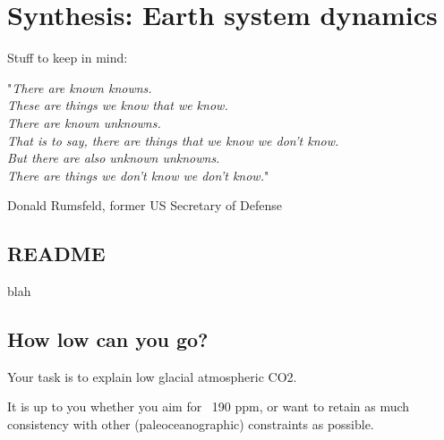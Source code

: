 \documentclass[11pt,fleqn]{book} %
\begin{document}

\cleardoublepage


\chapter{Synthesis: Earth system dynamics}\label{ch:earth-system-dynamics}

\hfill \break

\vspace{18mm}

\noindent Stuff to keep in mind:
\hfill \break

\noindent "\textit{There are known knowns.\\
These are things we know that we know.\\
There are known unknowns.\\
That is to say, there are things that we know we don't know.\\
But there are also unknown unknowns.\\
There are things we don't know we don't know.}"

\hfill \break
\noindent Donald Rumsfeld, former US Secretary of Defense


\newpage


\section{README}

blah


\newpage


\section{How low can you go?}

Your task is to explain low glacial atmospheric CO2.

It is up to you whether you aim for ~190 ppm, or want to retain as much consistency with other (paleoceanographic) constraints as possible.
\end{document}
